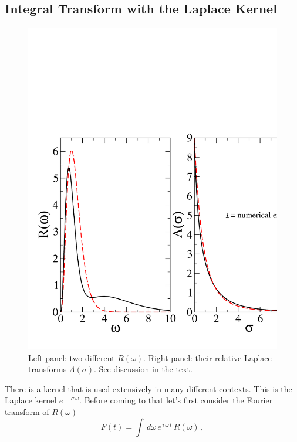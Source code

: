 \subsection{Integral Transform with the Laplace Kernel}\label{sec:LAPLACE} 
\begin{figure}
\sidecaption
\includegraphics[scale=.65]{Chapter7-figures/fig3.pdf}
%
%
\caption{Left panel: two different $R(\omega)$. Right panel: their relative Laplace transforms $\Lambda(\sigma)$. 
See discussion in the text.}
\label{fig:3}       %
\end{figure}
There is a kernel that is used extensively in many different contexts. This is the Laplace kernel $e^{\,-\sigma\,\omega}$. 
Before coming to that let's  first  consider  the Fourier transform of  $R(\omega)$ 
\begin{equation}
F(t)=\int\, d\omega\, e^{\,i\, \omega\, t}\, R(\omega)\,,
\end{equation}
